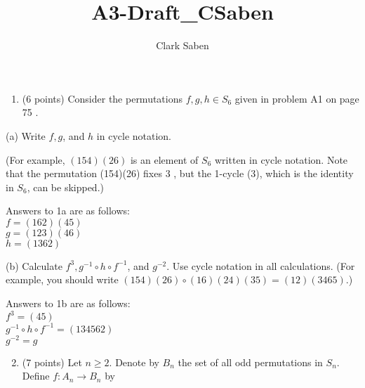 \documentclass[12pt]{article}
\newenvironment{problem}[2][Problem]{\begin{trivlist}
\item[\hskip \labelsep {\bfseries #1}\hskip \labelsep {\bfseries #2.}]}{\end{trivlist}}
\begin{document}
 
 
\title{A3-Draft\_CSaben}
\author{Clark Saben}

 
\maketitle
\begin{enumerate}
  \item (6 points) Consider the permutations $f, g, h \in S_{6}$ given in problem A1 on page 75 .
\end{enumerate}

(a) Write $f, g$, and $h$ in cycle notation.

(For example, $(154)(26)$ is an element of $S_{6}$ written in cycle notation. Note that the permutation (154)(26) fixes 3 , but the 1-cycle (3), which is the identity in $S_{6}$, can be skipped.)


\begin{problem}{1a} 
	Answers to 1a are as follows: \\
	\center
	$f = (162)(45)$ \\
	$g = (123)(46)$ \\
	$h = (1362)$ \\
\end{problem}



(b) Calculate $f^{3}, g^{-1} \circ h \circ f^{-1}$, and $g^{-2}$. Use cycle notation in all calculations. (For example, you should write $(154)(26) \circ(16)(24)(35)=(12)(3465)$.)
\begin{problem}{1b} 
	Answers to 1b are as follows: \\
	\center
	$f^3 = (45)$ \\
	$g^{-1} \circ h \circ f^{-1} = (134562)$ \\
	$g^{-2} = g$
\end{problem}

\begin{enumerate}
  \setcounter{enumi}{1}
  \item (7 points) Let $n \geq 2$. Denote by $B_{n}$ the set of all odd permutations in $S_{n}$. Define $f: A_{n} \rightarrow B_{n}$ by
\end{enumerate}
\end{document}
